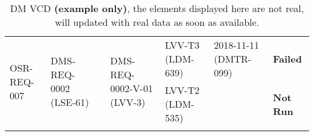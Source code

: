 \begin{longtable}[]{|p{1.5cm}|p{2.7cm}|p{1.5cm}|p{3.2cm}|p{1.5cm}|p{1.7cm}|p{1.5cm}|}
\multirow{2}{*}{
\tiny OSR-REQ-007} &
\multirow{2}{*}{
\begin{minipage}[t]{0.9\columnwidth}
{\small DMS-REQ-0002}\newline
{\scriptsize (LSE-61)}
\end{minipage}} &
\multirow{2}{*}{} &
\multirow{2}{*}{
\begin{minipage}[t]{0.9\columnwidth}
{\small DMS-REQ-0002-V-01}\newline
{\scriptsize (LVV-3)}
\end{minipage}} &
\begin{minipage}[t]{0.9\columnwidth}
{\small LVV-T3}\newline
{\scriptsize (LDM-639)}
\end{minipage} &
\begin{minipage}[t]{0.9\columnwidth}
{\small 2018-11-11}\newline
{\scriptsize (DMTR-099)}
\end{minipage} &
{\small \bf Failed} \\ \cline{5-7}
 & & & &
\begin{minipage}[t]{0.9\columnwidth}
{\small LVV-T2}\newline
{\scriptsize (LDM-535)}
\end{minipage} &
 &
{\small \bf Not Run}
\\\hline

\caption{DM VCD {\bf (example only)}, the elements displayed here are not real, will updated with real data as soon as available.}
\label{tab:dmvcd}
\end{longtable}
